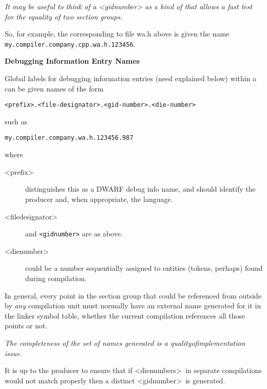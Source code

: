 \textit{It may be useful to think of a 
\textless gid\dash number\textgreater
as a kind
of  that allows a fast test for the
equality of two 
section groups.}

So, for example, the  
corresponding to file wa.h
above is given the name \texttt{my.compiler.company.cpp.wa.h.123456}.



\textbf{Debugging Information Entry Names}

Global labels for 
debugging information entries (need explained
below) within a 
can be given names of the form

\begin{alltt}
    <prefix>.<file-designator>.<gid-number>.<die-number>
\end{alltt}

such as

\begin{alltt}
    my.compiler.company.wa.h.123456.987
\end{alltt}

where
\begin{description}
\item [\textless prefix\textgreater]  
distinguishes this as a DWARF debug info name, and should identify the producer
and, when appropriate, the language.
\item [\textless file\dash designator\textgreater]  
and 
\texttt{\textless gid\dash number\textgreater} 
are as above.

\item  [\textless die\dash number\textgreater]
could be a number sequentially assigned 
to entities (tokens, perhaps) found
during compilation.

\end{description}

In general, every point in the 
section group 
\dotdebuginfo{} that
could be referenced from outside by \emph{any} compilation unit must
normally have an external name generated for it in the linker
symbol table, whether the current compilation references all
those points or not.

\textit{The completeness of the set of names generated is a
quality\dash of\dash implementation issue.}

It is up to the producer to ensure that if 
\textless die\dash numbers\textgreater\ 
in separate compilations would not match properly then a
distinct 
\textless gid\dash number\textgreater\ 
is generated.

